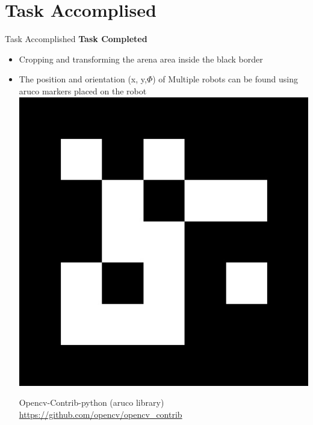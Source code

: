 \documentclass[11pt, a4paper]{beamer}
\begin{document}
\section{Task Accomplised}
\begin{frame}{Task Accomplished}
	\textbf{Task Completed}
	\begin{itemize}	
	\item Cropping and transforming the arena area inside the black border
		\item The position and orientation (x, y,$\Phi$) of Multiple robots can be found using aruco markers placed on the robot\\
		\includegraphics[scale =.1]{images/aruco.jpg}
		
		
		 Opencv-Contrib-python (aruco library)\\ \url{https://github.com/opencv/opencv_contrib}
\end{itemize}
\end{frame}	
\end{document}
